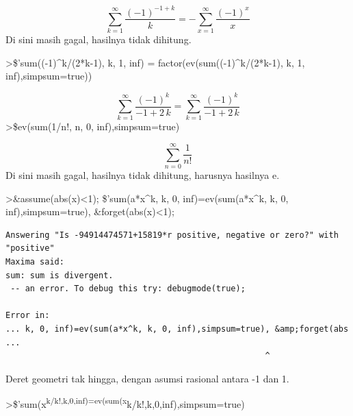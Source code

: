 \documentclass[
]{book}
\begin{document}
\[\sum_{k=1}^{\infty }{\frac{\left(-1\right)^{-1+k}}{k}}=-\sum_{x=1
}^{\infty }{\frac{\left(-1\right)^{x}}{x}}\]Di sini masih gagal, hasilnya tidak dihitung.

\textgreater\$'sum((-1)\^{}k/(2*k-1), k, 1, inf) = factor(ev(sum((-1)\^{}k/(2*k-1), k, 1, inf),simpsum=true))

\[\sum_{k=1}^{\infty }{\frac{\left(-1\right)^{k}}{-1+2\,k}}=\sum_{k=1
 }^{\infty }{\frac{\left(-1\right)^{k}}{-1+2\,k}}\]\textgreater\$ev(sum(1/n!, n, 0, inf),simpsum=true)

\[\sum_{n=0}^{\infty }{\frac{1}{n!}}\]Di sini masih gagal, hasilnya tidak dihitung, harusnya hasilnya e.

\textgreater\&assume(abs(x)\textless1); \$'sum(a*x\^{}k, k, 0, inf)=ev(sum(a*x\^{}k, k, 0, inf),simpsum=true), \&forget(abs(x)\textless1);

\begin{verbatim}
Answering "Is -94914474571+15819*r positive, negative or zero?" with "positive"
Maxima said:
sum: sum is divergent.
 -- an error. To debug this try: debugmode(true);

Error in:
... k, 0, inf)=ev(sum(a*x^k, k, 0, inf),simpsum=true), &amp;forget(abs ...
                                                     ^
\end{verbatim}

Deret geometri tak hingga, dengan asumsi rasional antara -1 dan 1.

\textgreater\$'sum(x\textsuperscript{k/k!,k,0,inf)=ev(sum(x}k/k!,k,0,inf),simpsum=true)
\end{document}
